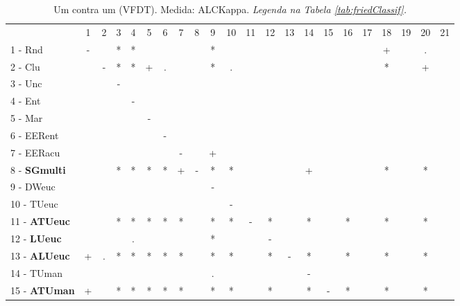 \begin{table}[h]
\caption{Um contra um (VFDT). Medida: ALCKappa. \textit{Legenda na Tabela \ref{tab:friedClassif}.}}
\begin{center}\begin{tabular}{lcc|cc|cc|cc|cc|cc|cc|cc|cc|cc|c}
 			& 1 & 2 & 3 & 4 & 5 & 6 & 7 & 8 & 9 & 10 & 11 & 12 & 13 & 14 & 15 & 16 & 17 & 18 & 19 & 20 & 21\\
1 - Rnd  	& - &   & * & * &   &   &   &   & * &   &   &   &   &   &   &   &   & + &   & . &   \\
2 - Clu  	&   & - & * & * & + & . &   &   & * & . &   &   &   &   &   &   &   & * &   & + &   \\ \hline
3 - Unc  	&   &   & - &   &   &   &   &   &   &   &   &   &   &   &   &   &   &   &   &   &   \\
4 - Ent  	&   &   &   & - &   &   &   &   &   &   &   &   &   &   &   &   &   &   &   &   &   \\ \hline
5 - Mar  	&   &   &   &   & - &   &   &   &   &   &   &   &   &   &   &   &   &   &   &   &   \\
6 - EERent	&   &   &   &   &   & - &   &   &   &   &   &   &   &   &   &   &   &   &   &   &   \\ \hline
7 - EERacu	&   &   &   &   &   &   & - &   & + &   &   &   &   &   &   &   &   &   &   &   &   \\
8 - \textbf{SGmulti}	&   &   & * & * & * & * & + & - & * & * &   &   &   & + &   &   &   & * &   & * &   \\ \hline
9 - DWeuc	&   &   &   &   &   &   &   &   & - &   &   &   &   &   &   &   &   &   &   &   &   \\
10 - TUeuc	&   &   &   &   &   &   &   &   &   & - &   &   &   &   &   &   &   &   &   &   &   \\ \hline
11 - \textbf{ATUeuc}	&   &   & * & * & * & * & * &   & * & * & - & * &   & * &   & * &   & * &   & * &   \\
12 - \textbf{LUeuc}	&   &   &   & . &   &   &   &   & * &   &   & - &   &   &   &   &   &   &   &   &   \\ \hline
13 - \textbf{ALUeuc}	& + & . & * & * & * & * & * &   & * & * &   & * & - & * &   & * &   & * &   & * &   \\
14 - TUman	&   &   &   &   &   &   &   &   & . &   &   &   &   & - &   &   &   &   &   &   &   \\ \hline
15 - \textbf{ATUman}	& + &   & * & * & * & * & * &   & * & * &   & * &   & * & - & * &   & * &   & * &   \\

\end{tabular}
\end{center}
\end{table}
